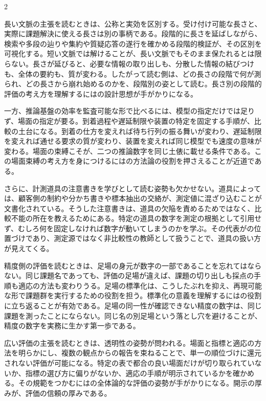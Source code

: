 \documentclass[lualatex,a4paper,10pt]{jlreq}
\begin{document}
\begin{multicols}{2}
\begin{technicalnote}[長文脈と監査可能性の見方]
長い文脈の主張を読むときは、公称と実効を区別する。受け付け可能な長さと、実際に課題解決に使える長さは別の事柄である。段階的に長さを延ばしながら、検索や多段の辿りや集約や質疑応答の遂行を確かめる段階的検証が、その区別を可視化する。短い文脈では解けることが、長い文脈でもそのまま保たれるとは限らない。長さが延びると、必要な情報の取り出しも、分散した情報の結びつけも、全体の要約も、質が変わる。したがって読む側は、どの長さの段階で何が測られ、どの長さから崩れ始めるのかを、段階別の姿として読む。長さ別の段階的評価の考え方を理解するには\autocite{ruler}の設計思想が手がかりになる。

一方、推論基盤の効率を監査可能な形で比べるには、模型の指定だけでは足りず、場面の指定が要る。到着過程や遅延制限や装置の特定を固定する手順が、比較の土台になる。到着の仕方を変えれば待ち行列の振る舞いが変わり、遅延制限を変えれば通せる要求の質が変わり、装置を変えれば同じ模型でも速度の意味が変わる。場面の束縛こそが、二つの推論数字を同じ土俵に載せる条件である。この場面束縛の考え方を身につけるには\autocite{mlperf}の方法論の役割を押さえることが近道である。

さらに、計測道具の注意書きを学びとして読む姿勢も欠かせない。道具によっては、顧客側の制約や分かち書きや標本抽出の交絡が、測定値に混ざり込むことが文書化されている。そうした注意書きは、道具の欠陥を責めるためではなく、比較不能の所在を教えるためにある。特定の道具の数字を測定の根拠として引用せず、むしろ何を固定しなければ数字が動いてしまうのかを学ぶ。その代表が\autocite{llmperf}の位置づけであり、測定源ではなく非比較性の教師として扱うことで、道具の扱い方が見えてくる。
\end{technicalnote}

\begin{technicalnote}[枠組みの開示を読む]
精度側の評価を読むときは、足場の身元が数字の一部であることを忘れてはならない。同じ課題名であっても、評価の足場が違えば、課題の切り出しも採点の手順も適応の方法も変わりうる。足場の標準化は、こうしたぶれを抑え、再現可能な形で課題群を実行するための役割を担う。標準化の意義を理解するには\autocite{lmharness}の役割に立ち返ることが有効である。足場の同一性が確認できない精度の数字は、同じ課題を測ったことにならない。同じ名の別足場という落とし穴を避けることが、精度の数字を実務に生かす第一歩である。

広い評価の主張を読むときは、透明性の姿勢が問われる。場面と指標と適応の方法を明らかにし、複数の観点からの報告を束ねることで、単一の順位づけに還元されない評価が可能になる。特定の表で都合の良い場面だけが切り取られていないか、指標の選び方に偏りがないか、適応の手順が明示されているかを確かめる。その規範をつかむには\autocite{helm}の全体論的な評価の姿勢が手がかりになる。開示の厚みが、評価の信頼の厚みである。


\end{technicalnote}
\end{multicols}
\end{document}
